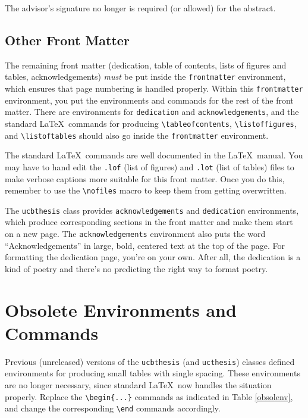 \documentclass[11pt]{article}
\newcommand*{\pkg}[1]{\texttt{#1}}
\begin{document}
The advisor's signature no longer is required (or allowed) for the
abstract.

\subsection{Other Front Matter}

The remaining front matter (dedication, table of contents, lists of
figures and tables, acknowledgements) \emph{must} be put inside the
\verb|frontmatter| environment, which ensures that page numbering is
handled properly.  Within this \verb|frontmatter| environment, you put the
environments and commands for the rest of the front matter.  There are
environments for \texttt{dedication} and \texttt{acknowledgements},
and the standard \LaTeX\ commands for producing \verb|\tableofcontents|,
\verb|\listoffigures|, and \verb|\listoftables| should also go inside
the \verb|frontmatter| environment.

The standard \LaTeX\ commands are well documented in the \LaTeX\ manual.
You may have to hand edit the \texttt{.lof} (list of figures) and
\texttt{.lot} (list of tables) files to make verbose captions more suitable for
this front matter.  Once you do this, remember to use the \verb|\nofiles|
macro to keep them from getting overwritten.

The \pkg{ucbthesis} class provides \texttt{acknowledgements} and
\texttt{dedication} environments, which produce corresponding sections in
the front matter and make them start on a new page.  The
\texttt{acknowledgements}
environment also puts the word ``Acknowledgements'' in large, bold,
centered text at the top of the page.  For formatting the dedication page,
you're on your own.  After all, the dedication is a kind of poetry and
there's no predicting the right way to format poetry.

\section{Obsolete Environments and Commands}

Previous (unreleased) versions of the \pkg{ucbthesis} (and \pkg{ucthesis})
classes defined environments for producing small tables with single spacing.
These environments are no longer necessary, since standard \LaTeX\ now
handles the situation properly.  Replace the \verb!\begin{...}!
commands as indicated in Table \ref{obsolenv}, and change the
corresponding \verb!\end! commands accordingly.
\end{document}
